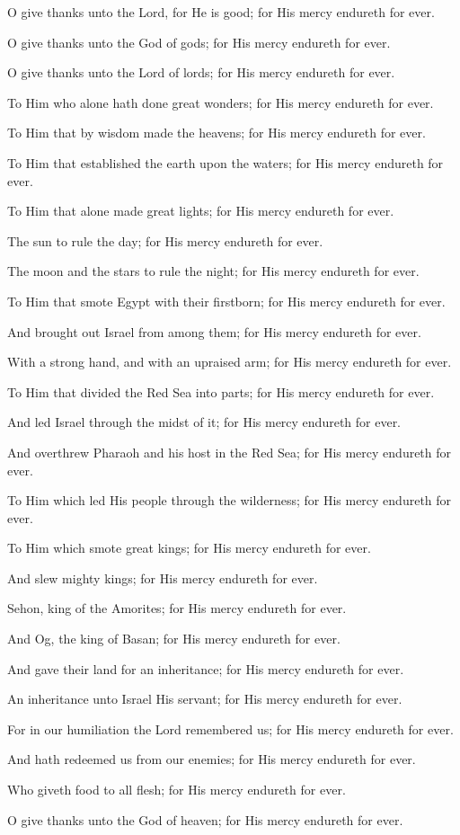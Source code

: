 O give thanks unto the Lord, for He is good; for His mercy endureth for ever.

O give thanks unto the God of gods; for His mercy endureth for ever.

O give thanks unto the Lord of lords; for His mercy endureth for ever.

To Him who alone hath done great wonders; for His mercy endureth for ever.

To Him that by wisdom made the heavens; for His mercy endureth for ever.

To Him that established the earth upon the waters; for His mercy endureth for ever.

To Him that alone made great lights; for His mercy endureth for ever.

The sun to rule the day; for His mercy endureth for ever.

The moon and the stars to rule the night; for His mercy endureth for ever.

To Him that smote Egypt with their firstborn; for His mercy endureth for ever.

And brought out Israel from among them; for His mercy endureth for ever.

With a strong hand, and with an upraised arm; for His mercy endureth for ever.

To Him that divided the Red Sea into parts; for His mercy endureth for ever.

And led Israel through the midst of it; for His mercy endureth for ever.

And overthrew Pharaoh and his host in the Red Sea; for His mercy endureth for ever.

To Him which led His people through the wilderness; for His mercy endureth for ever.

To Him which smote great kings; for His mercy endureth for ever.

And slew mighty kings; for His mercy endureth for ever.

Sehon, king of the Amorites; for His mercy endureth for ever.

And Og, the king of Basan; for His mercy endureth for ever.

And gave their land for an inheritance; for His mercy endureth for ever.

An inheritance unto Israel His servant; for His mercy endureth for ever.

For in our humiliation the Lord remembered us; for His mercy endureth for ever.

And hath redeemed us from our enemies; for His mercy endureth for ever.

Who giveth food to all flesh; for His mercy endureth for ever.

O give thanks unto the God of heaven; for His mercy endureth for ever.
